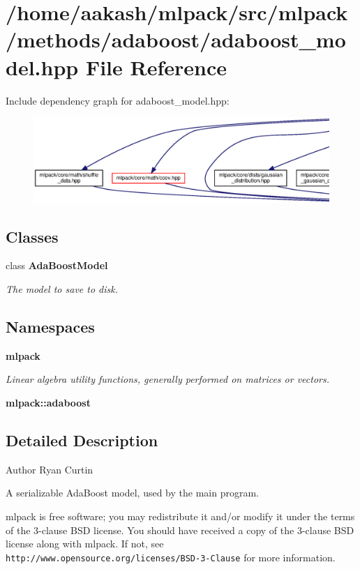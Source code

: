 \section{/home/aakash/mlpack/src/mlpack/methods/adaboost/adaboost\+\_\+model.hpp File Reference}
\label{adaboost__model_8hpp}
Include dependency graph for adaboost\+\_\+model.\+hpp\+:
\nopagebreak
\begin{figure}[H]
\begin{center}
\leavevmode
\includegraphics[width=350pt]{adaboost__model_8hpp__incl}
\end{center}
\end{figure}
\subsection*{Classes}
\begin{DoxyCompactItemize}
\item 
class \textbf{ Ada\+Boost\+Model}
\begin{DoxyCompactList}\small\item\em The model to save to disk. \end{DoxyCompactList}\end{DoxyCompactItemize}
\subsection*{Namespaces}
\begin{DoxyCompactItemize}
\item 
 \textbf{ mlpack}
\begin{DoxyCompactList}\small\item\em Linear algebra utility functions, generally performed on matrices or vectors. \end{DoxyCompactList}\item 
 \textbf{ mlpack\+::adaboost}
\end{DoxyCompactItemize}


\subsection{Detailed Description}
\begin{DoxyAuthor}{Author}
Ryan Curtin
\end{DoxyAuthor}
A serializable Ada\+Boost model, used by the main program.

mlpack is free software; you may redistribute it and/or modify it under the terms of the 3-\/clause B\+SD license. You should have received a copy of the 3-\/clause B\+SD license along with mlpack. If not, see {\tt http\+://www.\+opensource.\+org/licenses/\+B\+S\+D-\/3-\/\+Clause} for more information. 